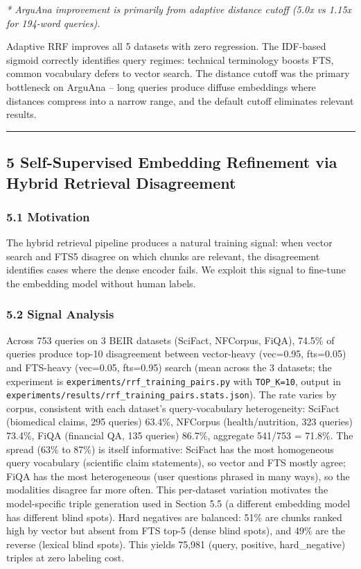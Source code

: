 \documentclass[
  11pt]{article}
\begin{document}
\emph{* ArguAna improvement is primarily from adaptive distance cutoff (5.0x vs 1.15x for 194-word queries).}

Adaptive RRF improves all 5 datasets with zero regression. The IDF-based sigmoid correctly identifies query regimes: technical terminology boosts FTS, common vocabulary defers to vector search. The distance cutoff was the primary bottleneck on ArguAna -- long queries produce diffuse embeddings where distances compress into a narrow range, and the default cutoff eliminates relevant results.

\begin{center}\rule{0.5\linewidth}{0.5pt}\end{center}

\subsection{5 Self-Supervised Embedding Refinement via Hybrid Retrieval Disagreement}\label{self-supervised-embedding-refinement-via-hybrid-retrieval-disagreement}

\subsubsection{5.1 Motivation}\label{motivation}

The hybrid retrieval pipeline produces a natural training signal: when vector search and FTS5 disagree on which chunks are relevant, the disagreement identifies cases where the dense encoder fails. We exploit this signal to fine-tune the embedding model without human labels.

\subsubsection{5.2 Signal Analysis}\label{signal-analysis}

Across 753 queries on 3 BEIR datasets (SciFact, NFCorpus, FiQA), 74.5\% of queries produce top-10 disagreement between vector-heavy (vec=0.95, fts=0.05) and FTS-heavy (vec=0.05, fts=0.95) search (mean across the 3 datasets; the experiment is \texttt{experiments/rrf\_training\_pairs.py} with \texttt{TOP\_K=10}, output in \texttt{experiments/results/rrf\_training\_pairs.stats.json}). The rate varies by corpus, consistent with each dataset's query-vocabulary heterogeneity: SciFact (biomedical claims, 295 queries) 63.4\%, NFCorpus (health/nutrition, 323 queries) 73.4\%, FiQA (financial QA, 135 queries) 86.7\%, aggregate 541/753 = 71.8\%. The spread (63\% to 87\%) is itself informative: SciFact has the most homogeneous query vocabulary (scientific claim statements), so vector and FTS mostly agree; FiQA has the most heterogeneous (user questions phrased in many ways), so the modalities disagree far more often. This per-dataset variation motivates the model-specific triple generation used in Section 5.5 (a different embedding model has different blind spots). Hard negatives are balanced: 51\% are chunks ranked high by vector but absent from FTS top-5 (dense blind spots), and 49\% are the reverse (lexical blind spots). This yields 75,981 (query, positive, hard\_negative) triples at zero labeling cost.
\end{document}
